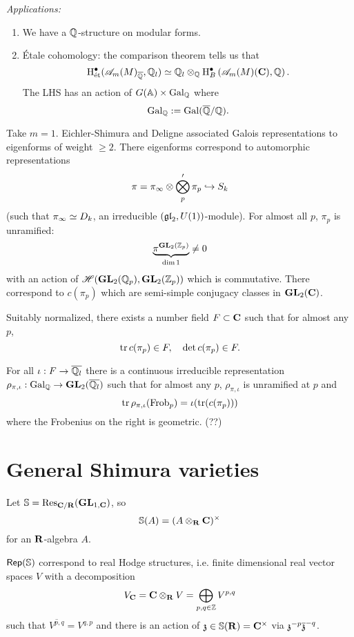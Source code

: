 \emph{Applications:}
\begin{enumerate}[1)]
\item We have a $\mathbb Q$-structure on modular forms.
\item \'Etale cohomology: the comparison theorem tells us that
	\[
		\mathrm{H}_{\text{\'et}}^{\bullet}(\mathscr{A}_m(M)_{\overline{\mathbb Q}}, \mathbb Q_l) \simeq \mathbb Q_l
		\otimes_{\mathbb Q}\mathrm{H}^{\bullet}_B\left( \mathscr{A}_m(M)(\mathbf{C}), \mathbb Q \right) .
	\]
	The LHS has an action of $G(\mathbb A)\times \operatorname{Gal}_\mathbb Q$ where
	\[
		\operatorname{Gal}_\mathbb Q := \operatorname{Gal}(\overline{\mathbb Q} /\mathbb Q).
	\]
\end{enumerate}
\begin{example}
Take $m=1$. Eichler-Shimura and Deligne associated Galois representations to eigenforms
of weight $\ge 2$. There eigenforms correspond to automorphic representations
\[
	\pi = \pi_{\infty}\otimes \bigotimes_p' \pi_{p} \hookrightarrow S_k
\]
(such that $\pi_{\infty}\simeq D_k$, an irreducible $(\mathfrak{gl}_2,U(1))$-module). For almost
all $p$, $\pi_p$ is unramified:
\[
	\underbrace{\pi^{\mathbf{GL}_2(\mathbb Z_p)}}_{\dim 1} \neq 0
\]
with an action of $\mathscr{H}(\mathbf{GL}_2(\mathbb Q_p),\mathbf{GL}_2(\mathbb Z_p))$ which is commutative. There
correspond to $c(\pi_p)$ which are semi-simple conjugacy classes in $\mathbf{GL}_2(\mathbf{C})$.

Suitably normalized, there exists a number field $F\subset \mathbf{C}$ such that for almost any $p$,
\[
	\operatorname{tr} c(\pi_p)\in F,\quad \operatorname{det} c(\pi_p)\in F.
\]
\end{example}
\begin{theorem}
For all $\iota:F\to \overline{\Q_l}$ there is a continuous irreducible representation
$\rho_{\pi,\iota}:\Gal_\Q\to \GL_2(\overline{\Q_l})$ such that for almost any $p$,
$\rho_{\pi,\iota}$ is unramified at $p$ and
\[
	\operatorname{tr} \rho_{\pi,\iota}(\operatorname{Frob}_p) = \iota(\operatorname{tr}(c(\pi_p)))
\]
where the Frobenius on the right is geometric. (??)
\end{theorem}

\section{General Shimura varieties}
\begin{definition}
Let $\mathbb{S} = \operatorname{Res}_{\mathbf{C} /\mathbf{R}}(\mathbf{GL}_{1,\mathbf{C}})$, so
\[
	\mathbb{S}(A) = (A\otimes_\mathbf{R}\mathbf{C})^{\times }
\]
for an $\mathbf{R}$-algebra $A$.
\end{definition}
$\mathsf{Rep}(\mathbb{S})$ correspond to real Hodge structures, i.e. finite dimensional real vector
spaces $V$ with a decomposition
\[
V_{\mathbf{C}}=\mathbf{C}\otimes_\mathbf{R} V = \bigoplus_{p,q\in \mathbb Z}V^{p,q}
\]
such that $\overline{V^{p,q}} = V^{q,p}$ and there is an action of $\mathfrak{z}\in
\mathbb{S}(\mathbf{R})=\mathbf{C}^{\times }$ via $\mathfrak{z}^{-p}\overline{\mathfrak{z}}^{-q}$.

